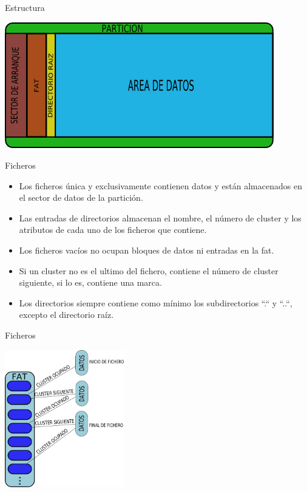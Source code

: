 \begin{frame}{Estructura}
  \begin{center}
    \includegraphics[height=5.5cm]{imgs/fat_struct.png}
  \end{center}
\end{frame}

\begin{frame}{Ficheros}
  \begin{itemize}
    \item Los ficheros única y exclusivamente contienen datos y están almacenados en el sector de datos de la partición.
    \item Las entradas de directorios almacenan el nombre, el número de cluster y los atributos de cada uno de los ficheros que contiene.
    \item Los ficheros vacíos no ocupan bloques de datos ni entradas en la fat.
    \item Si un cluster no es el ultimo del fichero, contiene el número de cluster siguiente, si lo es, contiene una marca.
    \item Los directorios siempre contiene como mínimo los subdirectorios ``.`` y ``..``, excepto el directorio raíz.
  \end{itemize}
\end{frame}

\begin{frame}{Ficheros}
  \begin{center}
    \includegraphics[height=6cm]{imgs/fat_files.png}
  \end{center}
\end{frame}
